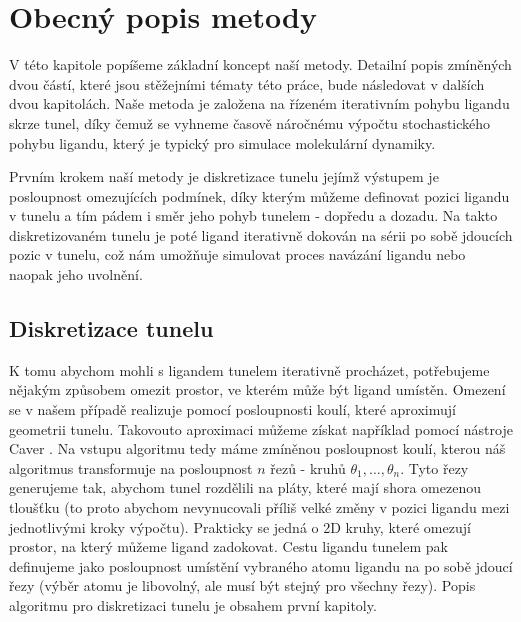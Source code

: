 \chapter{Obecný popis metody}
\setcounter{page}{1}

V této kapitole popíšeme základní koncept naší metody. Detailní popis zmíněných
dvou částí, které jsou stěžejními tématy této práce, bude následovat v dalších
dvou kapitolách. Naše metoda je založena na řízeném iterativním pohybu ligandu
skrze tunel, díky čemuž se vyhneme časově náročnému výpočtu stochastického
pohybu ligandu, který je typický pro simulace molekulární dynamiky.

Prvním krokem naší metody je diskretizace tunelu jejímž výstupem je posloupnost
omezujících podmínek, díky kterým můžeme definovat pozici ligandu v tunelu a
tím pádem i směr jeho pohyb tunelem - dopředu a dozadu. Na takto diskretizovaném
tunelu je poté ligand iterativně dokován na sérii po sobě jdoucích pozic v tunelu,
což nám umožňuje simulovat proces navázání ligandu nebo naopak jeho uvolnění.





\section{Diskretizace tunelu}
K tomu abychom mohli s ligandem tunelem iterativně procházet, potřebujeme nějakým
způsobem omezit prostor, ve kterém může být ligand umístěn.
Omezení se v našem případě realizuje pomocí posloupnosti koulí, které aproximují
geometrii tunelu. Takovouto aproximaci můžeme získat například pomocí nástroje
Caver \cite{Caver}. Na vstupu algoritmu tedy máme zmíněnou posloupnost
koulí, kterou náš algoritmus transformuje na posloupnost $ n $ řezů - kruhů
$ \theta_1, \dots, \theta_n $. Tyto řezy generujeme tak, abychom tunel rozdělili
na pláty, které mají shora omezenou tloušťku (to proto abychom nevynucovali
příliš velké změny v pozici ligandu mezi jednotlivými kroky výpočtu). Prakticky
se jedná o 2D kruhy, které omezují prostor, na který můžeme ligand zadokovat.
Cestu ligandu tunelem pak definujeme jako posloupnost umístění vybraného atomu
ligandu na po sobě jdoucí řezy (výběr atomu je libovolný, ale musí být stejný
pro všechny řezy). Popis algoritmu pro diskretizaci tunelu je obsahem první kapitoly.

